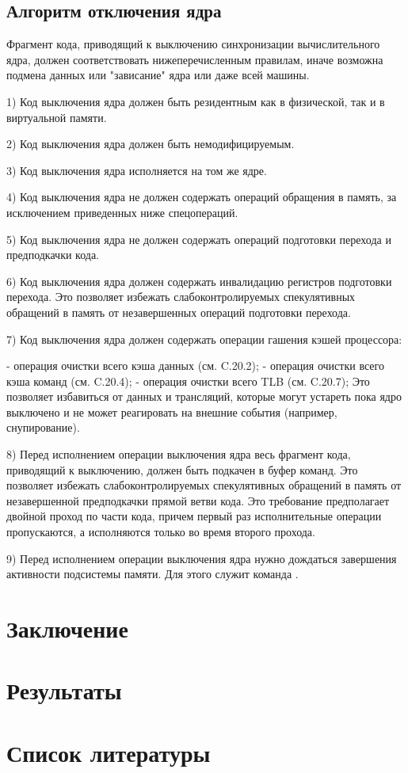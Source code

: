 \documentclass{article}
\begin{document}
\subsection{Алгоритм отключения ядра}

Фрагмент кода, приводящий к выключению синхронизации вычислительного ядра,
должен соответствовать нижеперечисленным правилам, иначе возможна подмена данных
или "зависание" ядра или даже всей машины.

1) Код выключения ядра должен быть резидентным как в физической, так и в виртуальной памяти.

2) Код выключения ядра должен быть немодифицируемым.

3) Код выключения ядра исполняется на том же ядре.

4) Код выключения ядра не должен содержать операций обращения в память, за
исключением приведенных ниже спецопераций.

5) Код выключения ядра не должен содержать операций подготовки перехода и
предподкачки кода.

6) Код выключения ядра должен содержать инвалидацию регистров подготовки
перехода. Это позволяет избежать слабоконтролируемых спекулятивных обращений в
память от незавершенных операций подготовки перехода.

7) Код выключения ядра должен содержать операции гашения кэшей процессора:

	- операция очистки всего кэша данных (см. C.20.2);
	       - операция очистки всего кэша команд (см. C.20.4);
	      - операция очистки всего TLB (см. C.20.7);
Это позволяет избавиться от данных и трансляций, которые могут устареть пока
ядро выключено и не может реагировать на внешние события (например,
снупирование).

8) Перед исполнением операции выключения ядра весь фрагмент кода, приводящий к
выключению, должен быть подкачен в буфер команд. Это позволяет избежать
слабоконтролируемых спекулятивных обращений в память от незавершенной
предподкачки прямой ветви кода. Это требование предполагает двойной проход по
части кода, причем первый раз исполнительные операции пропускаются, а
исполняются только во время второго прохода.

9) Перед исполнением операции выключения ядра нужно дождаться завершения
активности подсистемы памяти. Для этого служит команда {}.

\newpage


\newpage
\section{Заключение}

\section{Результаты}

\newpage
\section{Список литературы}
\end{document}
